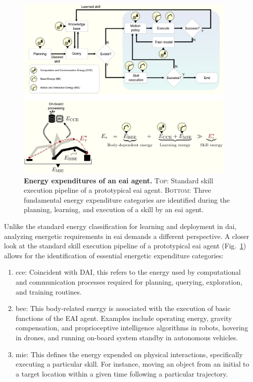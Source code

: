 \documentclass[12pt]{article}
\begin{document}
\begin{figure}[t!]
	\centering
	\hspace*{\fill}
	\includegraphics[width=0.95\textwidth]{eai_energy_categories.png}
	\hspace*{\fill}
	\caption[] {\label{fig:embodied_ai_pipeline} \textbf{Energy expenditures of an \ac{eai} agent.} {\textsc{Top}: Standard skill execution pipeline of a prototypical \ac{eai} agent. \textsc{Bottom}: Three fundamental energy expenditure categories are identified during the planning, learning, and execution of a skill by an \ac{eai} agent.}}
\end{figure}

Unlike the standard energy classification for learning and deployment in \ac{dai}, analyzing energetic requirements in \ac{eai} demands a different perspective. A closer look at the standard skill execution pipeline of a prototypical \ac{eai} agent (Fig.~\ref{fig:embodied_ai_pipeline}) allows for the identification of essential energetic expenditure categories:
\begin{enumerate}
	\item \Acl{cce}: Coincident with DAI, this refers to the energy used by computational and communication processes required for planning, querying, exploration, and training routines.
	\item \Acl{bee}: This body-related energy is associated with the execution of basic functions of the EAI agent. Examples include operating energy, gravity compensation, and proprioceptive intelligence algorithms in robots, hovering in drones, and running on-board system standby in autonomous vehicles.
	\item \Acl{mie}: This defines the energy expended on physical interactions, specifically executing a particular skill. For instance, moving an object from an initial to a target location within a given time following a particular trajectory.
\end{enumerate}
\end{document}
